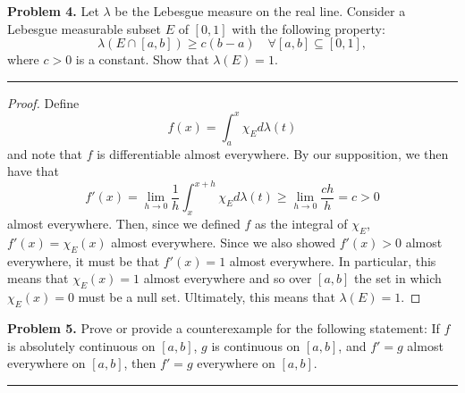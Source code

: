 \documentclass[leqno]{article}
\theoremstyle{nonumberplain}
\newtheorem{proof}{Proof}
\begin{document}
\pagebreak



\noindent\textbf{Problem 4.} \quad
Let $\lambda$ be the Lebesgue measure on the real line. Consider a Lebesgue measurable subset $E$ of $[0,1]$ with the following property:
\[
\lambda(E\cap [a,b]) \geq c (b-a) \quad \forall [a,b] \subseteq [0,1],
\]
where $c>0$ is a constant. Show that $\lambda(E)=1$.


\noindent\rule[0.5ex]{\linewidth}{1pt}


\begin{proof}
Define 
\[
f(x)=\int_a^x \chi_E d\lambda(t)
\]
and note that $f$ is differentiable almost everywhere. By our supposition, we then have that
\[
f'(x)=\lim_{h\to 0} \frac{1}{h}\int_x^{x+h} \chi_E d\lambda(t) \geq \lim_{h\to 0} \frac{ch}{h}=c>0
\]
almost everywhere.  Then, since we defined $f$ as the integral of $\chi_E$, $f'(x)=\chi_E(x)$ almost everywhere. Since we also showed $f'(x)>0$ almost everywhere, it must be that $f'(x)=1$ almost everywhere.  In particular, this means that $\chi_E(x)=1$ almost everywhere and so over $[a,b]$ the set in which $\chi_E(x)=0$ must be a null set. Ultimately, this means that $\lambda(E)=1$.
\end{proof}


\pagebreak


\noindent\textbf{Problem 5.} \quad
Prove or provide a counterexample for the following statement:
If $ f $ is absolutely continuous on $ [a,b] $,
$ g $ is continuous on $ [a,b] $,
and $ f'=g $ almost everywhere on $ [a,b] $,
then $ f'=g $ everywhere on $ [a,b] $.

\noindent\rule[0.5ex]{\linewidth}{1pt}
\end{document}
